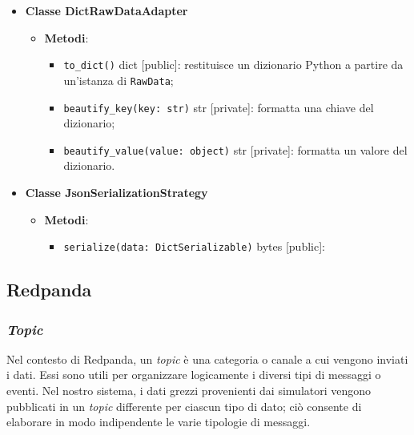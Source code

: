 \begin{itemize}
\begin{itemize}
	      \end{itemize}
	\item \textbf{Classe DictRawDataAdapter}
	      \begin{itemize}
		      \item \textbf{Metodi}:
		            \begin{itemize}
			            \item \texttt{to\_dict()} dict [public]: restituisce un dizionario Python a partire da un'istanza di \texttt{RawData};
			            \item \texttt{beautify\_key(key: str)} str [private]: formatta una chiave del dizionario;
			            \item \texttt{beautify\_value(value: object)} str [private]: formatta un valore del dizionario.
		            \end{itemize}
	      \end{itemize}
	\item \textbf{Classe JsonSerializationStrategy}
	      \begin{itemize}
		      \item \textbf{Metodi}:
		            \begin{itemize}
			            \item \texttt{serialize(data: DictSerializable)} bytes [public]:
		            \end{itemize}
	      \end{itemize}

\end{itemize}

\subsection{Redpanda}
\subsubsection{\textit{Topic}}
Nel contesto di Redpanda, un \textit{topic} è una categoria o canale a cui vengono inviati i dati. Essi sono utili per
organizzare logicamente i diversi tipi di messaggi o eventi. Nel nostro sistema, i dati grezzi provenienti dai simulatori vengono pubblicati in un \textit{topic}
differente per ciascun tipo di dato; ciò consente di elaborare in modo indipendente le varie tipologie di messaggi.

